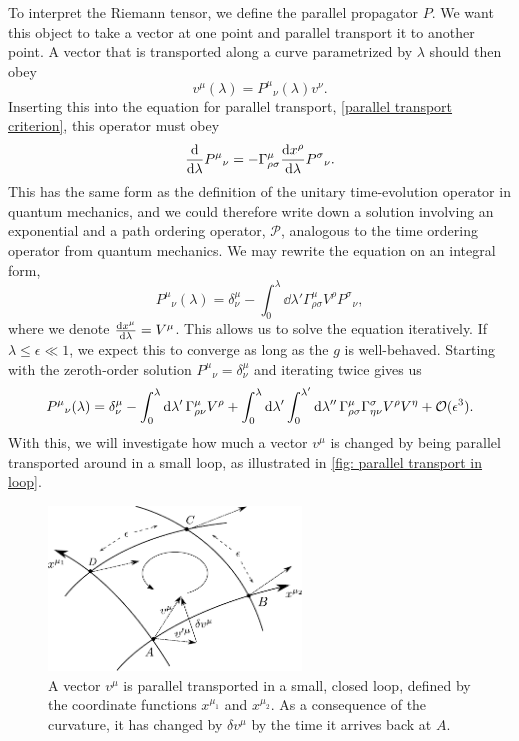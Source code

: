 To interpret the Riemann tensor, we define the parallel propagator $P$.
We want this object to take a vector at one point and parallel transport it to another point.
A vector that is transported along a curve parametrized by $\lambda$ should then obey
%
\begin{equation}
    v^\mu(\lambda) = P^\mu{}_\nu(\lambda) v^\nu.
\end{equation}
%
Inserting this into the equation for parallel transport, \autoref{parallel transport criterion}, this operator must obey
%
\begin{equation}
    \odv{}{\lambda} P^\mu{}_\nu = - \Gamma^\mu_{\rho \sigma}  \odv{x^\rho}{\lambda}P^\sigma{}_\nu.
\end{equation}
%
This has the same form as the definition of the unitary time-evolution operator in quantum mechanics, and we could therefore write down a solution involving an exponential and a path ordering operator, $\mathcal P$, analogous to the time ordering operator from quantum mechanics.
We may rewrite the equation on an integral form,
%
\begin{equation}
    P^\mu{}_\nu(\lambda) = \delta^\mu_\nu 
    - \int^\lambda_0 \dd \lambda' \Gamma^\mu_{\rho \sigma} V^\rho P^\sigma{}_\nu,
\end{equation}
%
where we denote $\odv{x^\mu}{\lambda} = V^\mu$.
This allows us to solve the equation iteratively.
If $\lambda \leq \epsilon \ll 1$, we expect this to converge as long as the $g$ is well-behaved.
Starting with the zeroth-order solution $P^{\mu}{}_\nu = \delta^\mu_\nu$ and iterating twice gives us
%
\begin{equation}
    \label{iterative paralell propagator}
    P^\mu{}_\nu(\lambda) 
    = 
    \delta^\mu_\nu 
    - \int_0^\lambda \text{d} \lambda' \, 
    \Gamma^\mu_{\rho \nu} V^\rho
    + \int_0^{\lambda} \text{d} \lambda ' \int_0^{\lambda'} \text{d} \lambda ''\,
    \Gamma^\mu_{\rho \sigma} \Gamma^\sigma_{\eta \nu} V^\rho V^\eta
    + \mathcal O(\epsilon^3).
\end{equation}
%
With this, we will investigate how much a vector $v^\mu$ is changed by being parallel transported around in a small loop, as illustrated in \autoref{fig: parallel transport in loop}.

\begin{figure}[H]
    \centering
    \includegraphics[width=0.6\textwidth]{figurer/parallel_transport.pdf}
    \caption{A vector $v^\mu$ is parallel transported in a small, closed loop, defined by the coordinate functions $x^{\mu_1}$ and $x^{\mu_2}$.
    As a consequence of the curvature, it has changed by $\delta v^\mu$ by the time it arrives back at $A$.}
    \label{fig: parallel transport in loop}
\end{figure}


